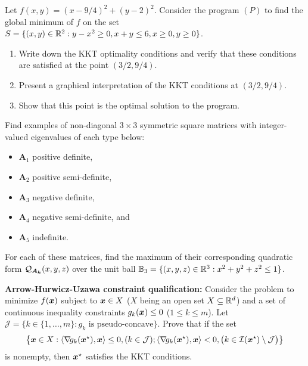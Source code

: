 \begin{problem}[Basic]\cite[lec6\_constr\_opt, 12]{Freund2004nonlinear}
Let $f(x,y)=(x-9/4)^2+(y-2)^2$.  Consider the program $(P)$ to find the global minimum of $f$ on the set $S = \{ (x,y) \in \mathbb{R}^2 : y-x^2 \geq 0, x+y\leq 6, x\geq 0, y \geq 0 \}$. 
\begin{enumerate}
	\item Write down the KKT optimality conditions and verify that these conditions are satisfied at the point $(3/2, 9/4)$.
	\item Present a graphical interpretation of the KKT conditions at $(3/2, 9/4)$.
	\item Show that this point is the optimal solution to the program.
\end{enumerate}
\end{problem}

\begin{problem}[Basic]
Find examples of non-diagonal $3\times 3$ symmetric square matrices with integer-valued eigenvalues of each type below: 
\begin{itemize}
\item $\boldsymbol{A}_1$ positive definite, 
\item $\boldsymbol{A}_2$ positive semi-definite, 
\item $\boldsymbol{A}_3$ negative definite, 
\item $\boldsymbol{A}_4$ negative semi-definite, and 
\item $\boldsymbol{A}_5$ indefinite. 
\end{itemize}
For each of these matrices, find the maximum of their corresponding quadratic form $\mathcal{Q}_{\boldsymbol{A_k}}(x,y,z)$ over the unit ball $\mathbb{B}_3 = \{ (x,y,z) \in \mathbb{R}^3: x^2+y^2+z^2 \leq 1 \}$.
\end{problem}

\begin{problem}[Advanced]\cite[lec6\_constr\_opt, 19]{Freund2004nonlinear}

\noindent\textbf{Arrow-Hurwicz-Uzawa constraint qualification:} Consider the problem to minimize $f(\boldsymbol{x})$ subject to $\boldsymbol{x} \in X$ ($X$ being an open set $X \subseteq \mathbb{R}^d$) and a set of continuous inequality constraints $g_k(\boldsymbol{x})\leq 0$ ($1\leq k \leq m$).  Let $\mathcal{J}=\big\{ k \in \{1, \dotsc, m\} : g_k \text{ is pseudo-concave}\big\}$. Prove that if the set 
\begin{equation*}
\big\{ \boldsymbol{x} \in X : \langle\mathop{\nabla\! {g_k}}(\boldsymbol{x}^{\star}), \boldsymbol{x}\rangle \leq 0, (k \in \mathcal{J}); \langle\mathop{\nabla\! {g_k}}(\boldsymbol{x}^{\star}), \boldsymbol{x} \rangle < 0, \big(k \in \mathcal{I}(\boldsymbol{x}^{\star})\setminus\mathcal{J}\big) \big\}
\end{equation*}
is nonempty, then $\boldsymbol{x}^{\star}$ satisfies the KKT conditions.
\end{problem}